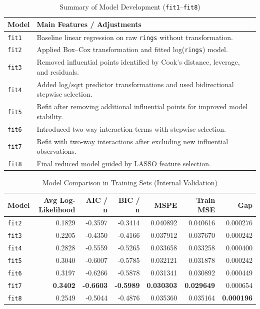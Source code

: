 \documentclass[12pt]{article}
\begin{document}
	\begin{table}[h!]
		\centering
		\caption{Summary of Model Development (\texttt{fit1}--\texttt{fit8})}
		\label{tab:model_development}
		\begin{tabular}{ll}
			\hline
			\textbf{Model} & \textbf{Main Features / Adjustments} \\
			\hline
			\texttt{fit1} & Baseline linear regression on raw \texttt{rings} without transformation. \\
			\texttt{fit2} & Applied Box--Cox transformation and fitted log(\texttt{rings}) model. \\
			\texttt{fit3} & Removed influential points identified by Cook’s distance, leverage, and residuals. \\
			\texttt{fit4} & Added log/sqrt predictor transformations and used bidirectional stepwise selection. \\
			\texttt{fit5} & Refit after removing additional influential points for improved model stability. \\
			\texttt{fit6} & Introduced two-way interaction terms with stepwise selection.\\
			\texttt{fit7} & Refit with two-way interactions after excluding new influential observations.\\
			\texttt{fit8} & Final reduced model guided by LASSO feature selection.\\
			\hline
		\end{tabular}
	\end{table}
	
	\begin{table}[H]
		\centering
		\caption{Model Comparison in Training Sets (Internal Validation)}
		\label{tab:model comparison}
		\begin{tabular}{lrrrrrr}
			\toprule
			Model & Avg Log-Likelihood & AIC / n & BIC / n & MSPE & Train MSE & Gap \\
			\midrule
			\texttt{fit2} & 0.1829 & -0.3597 & -0.3414 & 0.040892 & 0.040616 & 0.000276 \\
			\texttt{fit3} & 0.2205 & -0.4350 & -0.4166 & 0.037912 & 0.037670 & 0.000242 \\
			\texttt{fit4} & 0.2828 & -0.5559 & -0.5265 & 0.033658 & 0.033258 & 0.000400 \\
			\texttt{fit5} & 0.3040 & -0.6007 & -0.5785 & 0.032121 & 0.031878 & 0.000242 \\
			\texttt{fit6} & 0.3197 & -0.6266 & -0.5878 & 0.031341 & 0.030892 & 0.000449 \\
			\texttt{fit7} & \textbf{0.3402} & \textbf{-0.6603} & \textbf{-0.5989} & \textbf{0.030303} & \textbf{0.029649} & 0.000654 \\
			\texttt{fit8} & 0.2549 & -0.5044 & -0.4876 & 0.035360 & 0.035164 & \textbf{0.000196} \\
			\bottomrule
		\end{tabular}
	\end{table}
	
\end{document}
